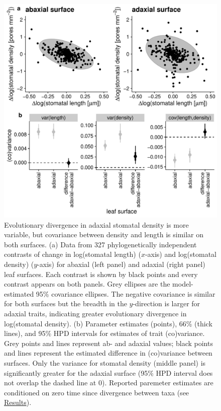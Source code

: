 \documentclass[
  10pt,
]{article}
\begin{document}
\begin{figure}[ht]
\includegraphics[width=\textwidth]{../figures/h1.pdf}
\caption{Evolutionary divergence in adaxial stomatal density is more variable, but covariance between density and length is similar on both surfaces. (a) Data from 327 phylogenetically independent contrasts of change in log(stomatal length) ($x$-axis) and log(stomatal density) ($y$-axis) for abaxial (left panel) and adaxial (right panel) leaf surfaces. Each contrast is shown by black points and every contrast appears on both panels. Grey ellipses are the model-estimated 95\% covariance ellipses. The negative covariance is similar for both surfaces but the breadth in the $y$-direction is larger for adaxial traits, indicating greater evolutionary divergence in log(stomatal density). (b) Parameter estimates (points), 66\% (thick lines), and 95\% HPD intervals for estimates of trait (co)variance. Grey points and lines represent ab- and adaxial values; black points and lines represent the estimated difference in (co)variance between surfaces. Only the variance for stomatal density (middle panel) is significantly greater for the adaxial surface (95\% HPD interval does not overlap the dashed line at 0). Reported paremeter estimates are conditioned on zero time since divergence between taxa (see \protect\hyperlink{results}{Results}).}
\label{fig:h1}
\end{figure}
\end{document}
